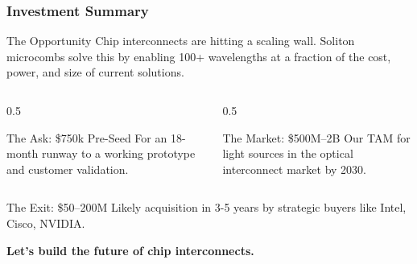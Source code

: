 \documentclass{beamer}
\begin{document}
\begin{frame}
    \frametitle{Investment Summary}
    
    \begin{block}{The Opportunity}
        Chip interconnects are hitting a scaling wall. Soliton microcombs solve this by enabling 100+ wavelengths at a fraction of the cost, power, and size of current solutions.
    \end{block}
    
    \begin{columns}[T]
        \begin{column}{0.5\textwidth}
            \begin{alertblock}{The Ask: \$750k Pre-Seed}
                For an 18-month runway to a working prototype and customer validation.
            \end{alertblock}
        \end{column}
        \begin{column}{0.5\textwidth}
            \begin{exampleblock}{The Market: \$500M--2B}
                Our TAM for light sources in the optical interconnect market by 2030.
            \end{exampleblock}
        \end{column}
    \end{columns}
    
    \begin{block}{The Exit: \$50--200M}
        Likely acquisition in 3-5 years by strategic buyers like Intel, Cisco, NVIDIA.
    \end{block}
    
    \begin{center}
        \vspace{0.5cm}
        \textbf{Let's build the future of chip interconnects.}
    \end{center}
\end{frame}
\end{document}
